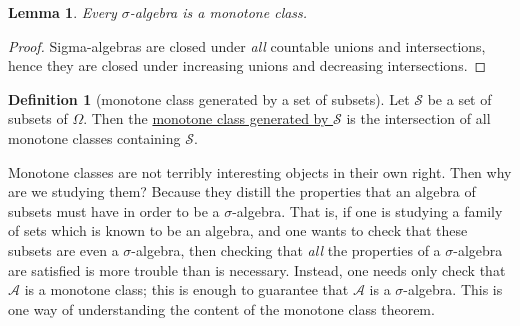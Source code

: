 \documentclass[a4paper,12pt]{scrreprt}
\newcommand{\defn}[1]{\ul{#1}}
\theoremstyle{definition}
\newtheorem{definition}{Definition}[section]
\theoremstyle{plain}
\newtheorem{lemma}{Lemma}[section]
\theoremstyle{remark}
\begin{document}
\begin{lemma}
  Every $\sigma$-algebra is a monotone class.
\end{lemma}
\begin{proof}
  Sigma-algebras are closed under \emph{all} countable unions and intersections, hence they are closed under increasing unions and decreasing intersections.
\end{proof}

\begin{definition}[monotone class generated by a set of subsets]
  \label{def:monotoneclassgeneratedbyaset}
  Let $\mathcal{S}$ be a set of subsets of $\Omega$. Then the \defn{monotone class generated by $\mathcal{S}$} is the intersection of all monotone classes containing $\mathcal{S}$.
\end{definition}

Monotone classes are not terribly interesting objects in their own right. Then why are we studying them? Because they distill the properties that an algebra of subsets must have in order to be a $\sigma$-algebra. That is, if one is studying a family of sets which is known to be an algebra, and one wants to check that these subsets are even a $\sigma$-algebra, then checking that \emph{all} the properties of a $\sigma$-algebra are satisfied is more trouble than is necessary. Instead, one needs only check that $\mathcal{A}$ is a monotone class; this is enough to guarantee that $\mathcal{A}$ is a $\sigma$-algebra. This is one way of understanding the content of the monotone class theorem.
\end{document}
